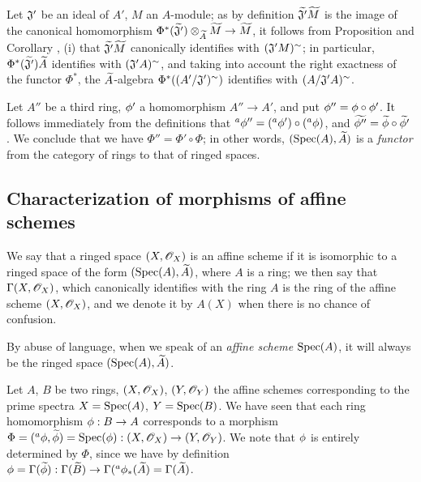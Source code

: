 \begin{env}[1.6.9]
\label{1.1.6.9}
Let $\mathfrak{J}'$ be an ideal of $A'$, $M$ an $A$-module; as by definition
$\widetilde{\mathfrak{J}'}\widetilde{M}$ is the image of the canonical homomorphism
$\Phi^*(\widetilde{\mathfrak{J}'})\otimes_{\widetilde{A}}\widetilde{M}\to\widetilde{M}$, it
follows from Proposition  and
Corollary , (i) that
$\widetilde{\mathfrak{J}'}\widetilde{M}$ canonically identifies with $(\mathfrak{J}' M)^\sim$;
in particular, $\Phi^*(\widetilde{\mathfrak{J}'})\widetilde{A}$ identifies with
$(\mathfrak{J}' A)^\sim$, and taking into account the right exactness of the functor $\Phi^*$,
the $\widetilde{A}$-algebra $\Phi^*((A'/\mathfrak{J}')^\sim)$ identifies with
$(A/\mathfrak{J}' A)^\sim$.
\end{env}

\begin{env}[1.6.10]
\label{1.1.6.10}
Let $A''$ be a third ring, $\phi'$ a homomorphism $A''\to A'$, and put
$\phi''=\phi\circ\phi'$. It follows immediately from the definitions that
${}^a\phi''=({}^a\phi')\circ({}^a\phi)$, and
$\widetilde{\phi''}=\widetilde{\phi}\circ\widetilde{\phi'}$ . We conclude
that we have $\Phi''=\Phi'\circ\Phi$; in other words, $({\mathop{\mathrm{Spec}}\nolimits}(A),\widetilde{A})$ is a
\emph{functor} from the category of rings to that of ringed spaces.
\end{env}

\subsection{Characterization of morphisms of affine schemes}
\label{subsection-morphisms-affine-schemes}

\begin{defn}[1.7.1]
\label{1.1.7.1}
We say that a ringed space $(X,\mathscr{O}_X)$ is an affine scheme if it is isomorphic to a ringed
space of the form $({\mathop{\mathrm{Spec}}\nolimits}(A),\widetilde{A})$, where $A$ is a ring; we then say that
$\Gamma(X,\mathscr{O}_X)$, which canonically identifies with the ring $A$  is the
ring of the affine scheme $(X,\mathscr{O}_X)$, and we denote it by $A(X)$ when there is no chance of
confusion.
\end{defn}

By abuse of language, when we speak of an \emph{affine scheme ${\mathop{\mathrm{Spec}}\nolimits}(A)$}, it will always be
the ringed space $({\mathop{\mathrm{Spec}}\nolimits}(A),\widetilde{A})$.

\begin{env}[1.7.2]
\label{1.1.7.2}
Let $A$, $B$ be two rings, $(X,\mathscr{O}_X)$, $(Y,\mathscr{O}_Y)$ the affine schemes corresponding to
the prime spectra $X={\mathop{\mathrm{Spec}}\nolimits}(A)$, $Y={\mathop{\mathrm{Spec}}\nolimits}(B)$. We have seen  that each ring
homomorphism $\phi:B\to A$ corresponds to a morphism
$\Phi=({}^a\phi,\widetilde{\phi})={\mathop{\mathrm{Spec}}\nolimits}(\phi):(X,\mathscr{O}_X)\to(Y,\mathscr{O}_Y)$. We note that $\phi$
is entirely determined by $\Phi$, since we have by definition
$\phi=\Gamma(\widetilde{\phi}):\Gamma(\widetilde{B})
\to\Gamma({}^a\phi_*(\widetilde{A})=\Gamma(\widetilde{A})$.
\end{env}


